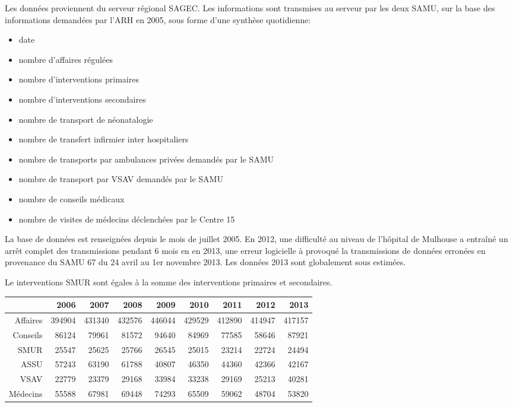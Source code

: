\documentclass[12pt,english,french,twoside]{report}\usepackage[]{graphicx}\usepackage[]{color}
\begin{document}
Les données proviennent du serveur régional SAGEC. Les informations sont transmises au serveur par les deux SAMU, sur la base des informations demandées par l'ARH en 2005, sous forme d'une synthèse quotidienne:
\begin{itemize}
  \item date
  \item nombre d'affaires régulées
  \item nombre d'interventions primaires
  \item nombre d'interventions secondaires
  \item nombre de transport de néonatalogie
  \item nombre de transfert infirmier inter hospitaliers
  \item nombre de transports par ambulances privées demandés par le SAMU
  \item nombre de transport par VSAV demandés par le SAMU
  \item nombre de conseils médicaux
  \item nombre de visites de médecins déclenchées par le Centre 15
\end{itemize}
La base de données est renseignées depuis le mois de juillet 2005. En 2012, une difficulté au niveau de l'hôpital de Mulhouse a entraîné un arrêt complet des transmissions pendant 6 mois en en 2013, une erreur logicielle à provoqué la transmissions de données erronées en provenance du SAMU 67 du 24 avril au 1er novembre 2013. Les données 2013 sont globalement sous estimées.

Le interventions SMUR sont égales à la somme des interventions primaires et secondaires.


\begin{table}[ht]
\centering
\begin{tabular}{rrrrrrrrr}
  \hline
 & 2006 & 2007 & 2008 & 2009 & 2010 & 2011 & 2012 & 2013 \\ 
  \hline
Affaires & 394904 & 431340 & 432576 & 446044 & 429529 & 412890 & 414947 & 417157 \\ 
  Conseils & 86124 & 79961 & 81572 & 94640 & 84969 & 77585 & 58646 & 87921 \\ 
  SMUR & 25547 & 25625 & 25766 & 26545 & 25015 & 23214 & 22724 & 24494 \\ 
  ASSU & 57243 & 63190 & 61788 & 40807 & 46350 & 44360 & 42366 & 42167 \\ 
  VSAV & 22779 & 23379 & 29168 & 33984 & 33238 & 29169 & 25213 & 40281 \\ 
  Médecins & 55588 & 67981 & 69448 & 74293 & 65509 & 59062 & 48704 & 53820 \\ 
   \hline
\end{tabular}
\end{table}
\end{document}
